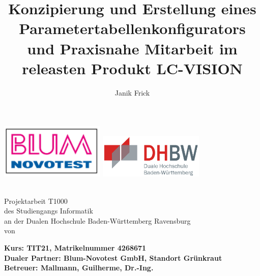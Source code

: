\documentclass[12pt,a4paper]{article}
\author{Janik Frick}
\title{Konzipierung und Erstellung eines Parametertabellenkonfigurators und Praxisnahe Mitarbeit im releasten Produkt LC-VISION}
\newcommand{\dualerPartner}{Blum-Novotest GmbH, Standort Grünkraut}
\newcommand{\hochschule}{Dualen Hochschule Baden-Württemberg Ravensburg}
\newcommand{\betreuer}{Mallmann, Guilherme, Dr.-Ing.}
\newcommand{\studiengang}{Informatik}
\newcommand{\kurs}{TIT21, Matrikelnummer 4268671}
\begin{document}
\begin{titlepage}
\includegraphics[width=50mm,scale=1]{blum-logo.PNG}
\hfill
\includegraphics[width=50mm,scale=1]{dhbw.png}
   \begin{center}
       \textbf{\huge{\thetitle}}\\
       \vspace{2.2cm}
       \Large{Projektarbeit T1000\\
       des Studiengangs \studiengang\\
       an der \hochschule\\
       \vspace{1.5cm}
       von\\
       \vspace{0.5cm}
       \theauthor}
       
   \end{center}
       \vspace{1.6cm}
       \noindent
       \vspace{0.3cm}
       \textbf{\large{Kurs: \kurs}}\\
       \vspace{0.3cm}
       \textbf{\large{Dualer Partner: \dualerPartner}}\\
       \vspace{0.3cm}
       \textbf{\large{Betreuer: \betreuer}}
       

\end{titlepage}
\onehalfspacing
\tableofcontents
\newpage
\end{document}
